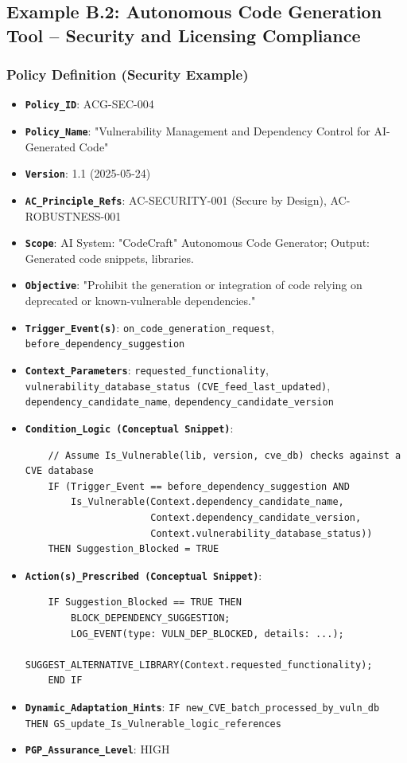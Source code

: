\documentclass[sigconf,review,anonymous=false]{acmart} %
\begin{document}
\subsection{Example B.2: Autonomous Code Generation Tool – Security and Licensing Compliance}
\label{app:policy_example_codegen}
\subsubsection{Policy Definition (Security Example)}
\begin{itemize}
    \item \textbf{\texttt{Policy\_ID}}: ACG-SEC-004
    \item \textbf{\texttt{Policy\_Name}}: "Vulnerability Management and Dependency Control for AI-Generated Code"
    \item \textbf{\texttt{Version}}: 1.1 (2025-05-24)
    \item \textbf{\texttt{AC\_Principle\_Refs}}: AC-SECURITY-001 (Secure by Design), AC-ROBUSTNESS-001
    \item \textbf{\texttt{Scope}}: AI System: "CodeCraft" Autonomous Code Generator; Output: Generated code snippets, libraries.
    \item \textbf{\texttt{Objective}}: "Prohibit the generation or integration of code relying on deprecated or known-vulnerable dependencies."
    \item \textbf{\texttt{Trigger\_Event(s)}}: \texttt{on\_code\_generation\_request}, \texttt{before\_dependency\_suggestion}
    \item \textbf{\texttt{Context\_Parameters}}: \texttt{requested\_functionality}, \texttt{vulnerability\_database\_status (CVE\_feed\_last\_updated)}, \texttt{dependency\_candidate\_name}, \texttt{dependency\_candidate\_version}
    \item \textbf{\texttt{Condition\_Logic (Conceptual Snippet)}}:
    \begin{verbatim}
    // Assume Is_Vulnerable(lib, version, cve_db) checks against a CVE database
    IF (Trigger_Event == before_dependency_suggestion AND
        Is_Vulnerable(Context.dependency_candidate_name,
                      Context.dependency_candidate_version,
                      Context.vulnerability_database_status))
    THEN Suggestion_Blocked = TRUE
    \end{verbatim}
    \item \textbf{\texttt{Action(s)\_Prescribed (Conceptual Snippet)}}:
    \begin{verbatim}
    IF Suggestion_Blocked == TRUE THEN
        BLOCK_DEPENDENCY_SUGGESTION;
        LOG_EVENT(type: VULN_DEP_BLOCKED, details: ...);
        SUGGEST_ALTERNATIVE_LIBRARY(Context.requested_functionality);
    END IF
    \end{verbatim}
    \item \textbf{\texttt{Dynamic\_Adaptation\_Hints}}: \texttt{IF new\_CVE\_batch\_processed\_by\_vuln\_db THEN GS\_update\_Is\_Vulnerable\_logic\_references}
    \item \textbf{\texttt{PGP\_Assurance\_Level}}: HIGH
\end{itemize}
\end{document}
